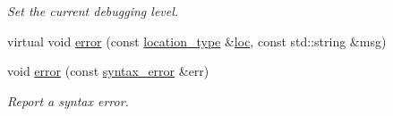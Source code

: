 \begin{DoxyCompactItemize}
\begin{DoxyCompactList}\small\item\em Set the current debugging level. \end{DoxyCompactList}\item 
virtual void \hyperlink{classyy_1_1genesyspp__parser_ad43bbe55e0b93d69db3e63c47021f3c7}{error} (const \hyperlink{classyy_1_1genesyspp__parser_aa0276d3782ebff157827ad5e7d44f97c}{location\-\_\-type} \&\hyperlink{_genesys_09_09-scanner_8cpp_abaf70dc7df8e78acc6505d164cb2276b}{loc}, const std\-::string \&msg)
\item 
void \hyperlink{classyy_1_1genesyspp__parser_a2c5b0f4df0100038887dc7804c112c5b}{error} (const \hyperlink{structyy_1_1genesyspp__parser_1_1syntax__error}{syntax\-\_\-error} \&err)
\begin{DoxyCompactList}\small\item\em Report a syntax error. \end{DoxyCompactList}\end{DoxyCompactItemize}
